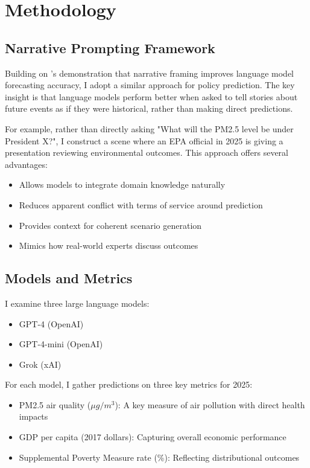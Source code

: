 \section{Methodology}\label{sec:methodology}

\subsection{Narrative Prompting Framework}

Building on \cite{cunningham2024base}'s demonstration that narrative framing improves language model forecasting accuracy, I adopt a similar approach for policy prediction. The key insight is that language models perform better when asked to tell stories about future events as if they were historical, rather than making direct predictions.

For example, rather than directly asking "What will the PM2.5 level be under President X?", I construct a scene where an EPA official in 2025 is giving a presentation reviewing environmental outcomes. This approach offers several advantages:

\begin{itemize}
    \item Allows models to integrate domain knowledge naturally
    \item Reduces apparent conflict with terms of service around prediction
    \item Provides context for coherent scenario generation
    \item Mimics how real-world experts discuss outcomes
\end{itemize}

\subsection{Models and Metrics}

I examine three large language models:
\begin{itemize}
    \item GPT-4 (OpenAI)
    \item GPT-4-mini (OpenAI)
    \item Grok (xAI)
\end{itemize}

For each model, I gather predictions on three key metrics for 2025:
\begin{itemize}
    \item PM2.5 air quality ($\mu g/m^3$): A key measure of air pollution with direct health impacts
    \item GDP per capita (2017 dollars): Capturing overall economic performance
    \item Supplemental Poverty Measure rate (\%): Reflecting distributional outcomes
\end{itemize}

